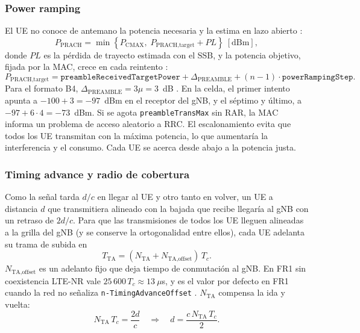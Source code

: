 \subsubsection{Power ramping}
El UE no conoce de antemano la potencia necesaria y la estima en lazo abierto \cite[§7.4]{ts38213}:
\begin{equation}
P_\text{PRACH} = \min\left\{P_\text{CMAX},\; P_\text{PRACH,target} + PL\right\}~[\text{dBm}],
\label{eq:pprach}
\end{equation}
donde $PL$ es la pérdida de trayecto estimada con el SSB, y la potencia objetivo, fijada por la MAC, crece en cada reintento \cite[§5.1.3]{ts38321}:
\begin{equation}
P_\text{PRACH,target} = \texttt{preambleReceivedTargetPower} + \Delta_\text{PREAMBLE} + (n-1)\cdot\texttt{powerRampingStep}.
\label{eq:ramping}
\end{equation}
Para el formato B4, $\Delta_\text{PREAMBLE} = 3\mu = 3$~dB \cite[tabla~7.3-2]{ts38321}. En la celda, el primer intento apunta a $-100 + 3 = -97$~dBm en el receptor del gNB, y el séptimo y último, a $-97 + 6\cdot 4 = -73$~dBm. Si se agota \texttt{preambleTransMax} sin RAR, la MAC informa un problema de acceso aleatorio a RRC. El escalonamiento evita que todos los UE transmitan con la máxima potencia, lo que aumentaría la interferencia y el consumo. Cada UE se acerca desde abajo a la potencia justa.

\subsubsection{Timing advance y radio de cobertura}\label{sec:ta}
Como la señal tarda $d/c$ en llegar al UE y otro tanto en volver, un UE a distancia $d$ que transmitiera alineado con la bajada que recibe llegaría al gNB con un retraso de $2d/c$. Para que las transmisiones de todos los UE lleguen alineadas a la grilla del gNB (y se conserve la ortogonalidad entre ellos), cada UE adelanta su trama de subida en \cite[§4.3.1]{ts38211}
\begin{equation}
T_\text{TA} = (N_\text{TA} + N_\text{TA,offset})\,T_c.
\label{eq:tta}
\end{equation}
$N_\text{TA,offset}$ es un adelanto fijo que deja tiempo de conmutación al gNB. En FR1 sin coexistencia LTE-NR vale $25\,600\,T_c\approx 13~\mu$s, y es el valor por defecto en FR1 cuando la red no señaliza \texttt{n-TimingAdvanceOffset} \cite[§7.1.2, tabla~7.1.2-2]{ts38133}. $N_\text{TA}$ compensa la ida y vuelta:
\begin{equation}
N_\text{TA}\,T_c = \frac{2d}{c}\quad\Longrightarrow\quad d = \frac{c\,N_\text{TA}\,T_c}{2}.
\label{eq:ta_d}
\end{equation}

